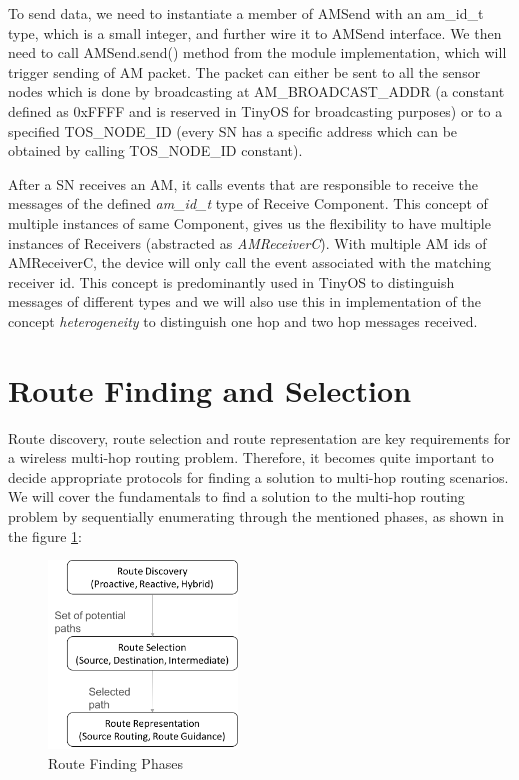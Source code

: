     To send data, we need to instantiate a member of AMSend with an am\_id\_t type, which is a small integer, and further wire it to AMSend interface. We then need to call AMSend.send() method from the module implementation, which will trigger sending of \ac{AM} packet. The packet can either be sent to all the sensor nodes which is done by broadcasting at AM\_BROADCAST\_ADDR (a constant defined as 0xFFFF and is reserved in TinyOS for broadcasting purposes) or to a specified TOS\_NODE\_ID (every \ac{SN} has a specific address which can be obtained by calling TOS\_NODE\_ID constant).
    
    \par
    After a \ac{SN} receives an \ac{AM}, it calls events that are responsible to receive the messages of the defined \textit{am\_id\_t} type of Receive Component. This concept of multiple instances of same Component, gives us the flexibility to have multiple instances of Receivers (abstracted as \textit{AMReceiverC}). With multiple \ac{AM} ids of AMReceiverC, the device will only call the event associated with the matching receiver id. This concept is predominantly used in TinyOS to distinguish messages of different types and we will also use this in implementation of the concept \textit{heterogeneity} to distinguish one hop and two hop messages received. 
    

\section{Route Finding and Selection}    

Route discovery, route selection and route representation are key requirements for a wireless multi-hop routing problem. Therefore, it becomes quite important to decide appropriate protocols for finding a solution to multi-hop routing scenarios. We will cover the fundamentals to find a solution to the multi-hop routing problem by sequentially enumerating through the mentioned phases, as shown in the figure \ref{fig:RouteFinding}:

\begin{figure}[h]
    \centering
	\includegraphics[height =5cm]{gfx/RouteFinding.png}
	\caption{Route Finding Phases}
	\label{fig:RouteFinding}
\end{figure}

